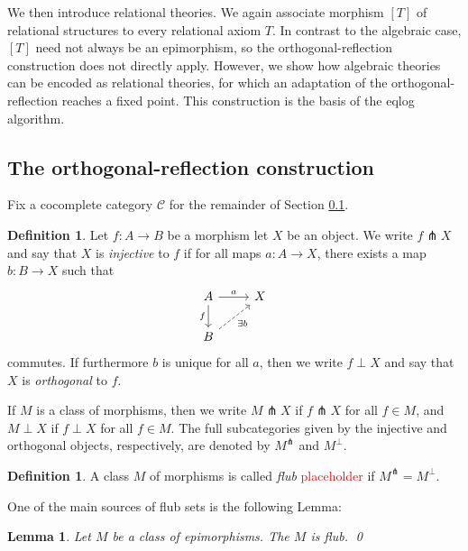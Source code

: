 \documentclass[a4paper]{article}
\newcommand{\todo}[1]{\textcolor{red}{#1}}
\newtheorem{lemma}[theorem]{Lemma}
\theoremstyle{remark}
\theoremstyle{definition}
\newtheorem{definition}[theorem]{Definition}
\begin{document}
We then introduce relational theories.
We again associate morphism $[T]$ of relational structures to every relational axiom $T$.
In contrast to the algebraic case, $[T]$ need not always be an epimorphism, so the orthogonal-reflection construction does not directly apply.
However, we show how algebraic theories can be encoded as relational theories, for which an adaptation of the orthogonal-reflection reaches a fixed point.
This construction is the basis of the eqlog algorithm.

\subsection{The orthogonal-reflection construction}
\label{subsec:orthogonal-reflection}

Fix a cocomplete category $\mathcal{C}$ for the remainder of Section \ref{subsec:orthogonal-reflection}.

\begin{definition}
  Let $f : A \rightarrow B$ be a morphism let $X$ be an object.
  We write $f \pitchfork X$ and say that $X$ is \emph{injective} to $f$ if for all maps $a : A \rightarrow X$, there exists a map $b : B \rightarrow X$ such that
  \begin{equation}
    \begin{tikzcd}
      A \arrow[r, "a"] \arrow[d, "f"'] & X \\
      B \arrow[ur, dashed, "\exists b"']
    \end{tikzcd}
  \end{equation}
  commutes.
  If furthermore $b$ is unique for all $a$, then we write $f \perp X$ and say that $X$ is \emph{orthogonal} to $f$.

  If $M$ is a class of morphisms, then we write $M \pitchfork X$ if $f \pitchfork X$ for all $f \in M$, and $M \perp X$ if $f \perp X$ for all $f \in M$.
  The full subcategories given by the injective and orthogonal objects, respectively, are denoted by $M^\pitchfork$ and $M^\perp$.
\end{definition}

\begin{definition}
  \label{def:flub}
  A class $M$ of morphisms is called \emph{flub} \todo{placeholder} if $M^\pitchfork = M^\perp$.
\end{definition}

One of the main sources of flub sets is the following Lemma:
\begin{lemma}
  Let $M$ be a class of epimorphisms.
  The $M$ is flub.
  \qed
\end{lemma}
\end{document}
